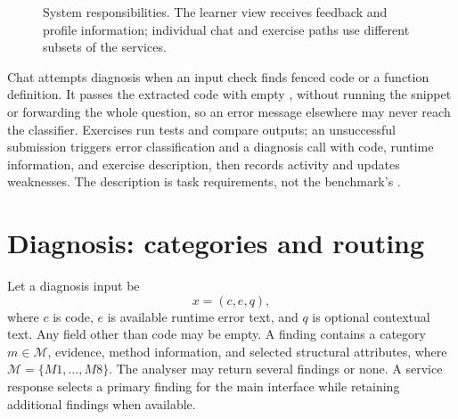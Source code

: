 \begin{figure}[htbp]
\centering
{}
\caption{System responsibilities. The learner view receives feedback and profile information; individual chat and exercise paths use different subsets of the services.}
\label{fig:architecture}
\end{figure}

Chat attempts diagnosis when an input check finds fenced code or a function definition. It passes the extracted code with empty , without running the snippet or forwarding the whole question, so an error message elsewhere may never reach the classifier. Exercises run tests and compare outputs; an unsuccessful submission triggers error classification and a diagnosis call with code, runtime information, and exercise description, then records activity and updates weaknesses. The description is task requirements, not the benchmark's .

\section{Diagnosis: categories and routing}
Let a diagnosis input be
\begin{equation}
x=(c,e,q),
\end{equation}
where $c$ is code, $e$ is available runtime error text, and $q$ is optional contextual text. Any field other than code may be empty. A finding contains a category $m\in\mathcal{M}$, evidence, method information, and selected structural attributes, where $\mathcal{M}=\{M1,\ldots,M8\}$. The analyser may return several findings or none. A service response selects a primary finding for the main interface while retaining additional findings when available.

